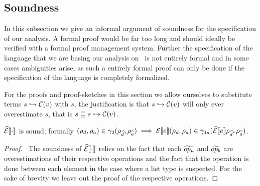 \subsection{Soundness}\label{subsec:soundness}

In this subsection we give an informal argument of soundness for the specification of our analysis.
A formal proof would be far too long and should ideally be verified with a formal proof management system.
Further the specification of the language that we are basing our analysis on~\cite{halder_abstract_2012} is not entirely formal and in some cases ambiguities arise, as such a entirely formal proof can only be done if the specification of the language is completely formalized.

For the proofs and proof-sketches in this section we allow ourselves to substitute terms $s \hookrightarrow \mathcal{C}(v)$ with $s$, the justification is that $s \hookrightarrow \mathcal{C}(v)$ will only ever overestimate $s$, that is $s \sqsubseteq s \hookrightarrow \mathcal{C}(v)$.

\begin{conjecture}\label{thm:sound-exp}
    $\widehat{\mathcal{E}}\llbracket \cdot \rrbracket$ is sound, formally $(\rho_d, \rho_a) \in \gamma_2(\rho_{\widehat{d}}, \rho_{\widehat{a}}) \implies \mathcal{E}\llbracket e \rrbracket(\rho_d, \rho_a) \in \gamma_{4a}(\widehat{\mathcal{E}}\llbracket e \rrbracket\rho_{\widehat{d}}, \rho_{\widehat{a}})$.
\end{conjecture}
\begin{proof}
    \pfsketch\
    The soundness of $\widehat{\mathcal{E}}\llbracket \cdot \rrbracket$ relies on the fact that each $\widetilde{op_u}$ and $\widetilde{op_b}$ are overestimations of their respective operations and the fact that the operation is done between each element in the case where a list type is suspected.
    For the sake of brevity we leave out the proof of the respective operations.
\end{proof}


